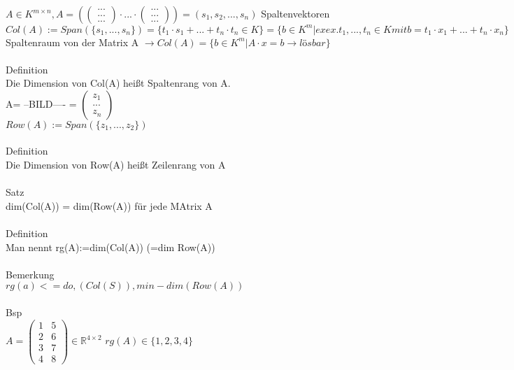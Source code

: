 \documentclass{scrartcl}
\begin{document}
\newpage
$A \in K^{m \times n}, A = (\begin{pmatrix}
	...\\...\\...
\end{pmatrix}\cdot ... \cdot \begin{pmatrix}
	... \\ ... \\ ...
\end{pmatrix} ) = (s_1,s_2,...,s_n)$ \hspace{1cm} Spaltenvektoren\\
$Col(A):= Span(\{ s_1, ..., s_n \}) = \{ t_1 \cdot s_1 + ... + t_n \cdot t_n \in K \} = \{ b \in K^m \vert ex ex. t_1, ..., t_n \in K mit b = t_1 \cdot x_1 + ... + t_n \cdot x_n \}$ \\
Spaltenraum von der Matrix A $\rightarrow Col(A) = \{ b \in K^m \vert A \cdot x = b \rightarrow lösbar \}$\\\\
Definition\\
Die Dimension von Col(A) heißt Spaltenrang von A. \\
A= --BILD---- = $\begin{pmatrix}
	z_1 \\ ... \\ z_n
\end{pmatrix}$\\
$Row(A) := Span(\{ z_1,..., z_2 \})$\\\\
Definition\\
Die Dimension von Row(A) heißt Zeilenrang von A \\\\
Satz\\
dim(Col(A)) = dim(Row(A)) für jede MAtrix A \\\\
Definition\\
Man nennt rg(A):=dim(Col(A)) (=dim Row(A))\\
\\
Bemerkung\\
$rg(a) <= do, (Col(S)), min-dim (Row(A))$\\
\\
Bsp\\
$A = \begin{pmatrix}
	1 & 5 \\ 2 & 6 \\ 3 & 7 \\ 4 & 8
\end{pmatrix} \in \mathbb{R}^{4 \times 2}$ \hspace{2cm} $rg(A) \in \{ 1, 2, 3, 4 \}$\\
\end{document}
